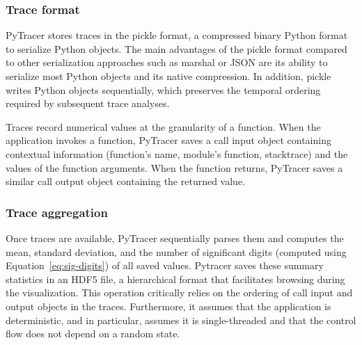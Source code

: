\documentclass[11pt]{article}
\newcommand{\pytracer}[0]{PyTracer\xspace}
\begin{document}

\subsubsection{Trace format}

\pytracer stores traces in the pickle format, a compressed binary Python format to serialize Python objects.
The main advantages of the pickle format compared to other serialization approaches such as marshal or JSON are its ability to serialize most Python objects and its native compression.  In addition, pickle writes Python objects sequentially, which preserves the temporal ordering required by subsequent trace analyses.

Traces record numerical values at the granularity of a function. When the application invokes a function, \pytracer saves a call input object containing contextual information (function's name, module's function, stacktrace) and the values of the function arguments. When the function returns, \pytracer saves a similar call output object containing the returned value. 


\subsubsection{Trace aggregation}

Once traces are available, \pytracer sequentially parses them and computes the mean, standard deviation, and the number of significant digits (computed using Equation~\ref{eq:sig-digits}) of all saved values. Pytracer saves these summary statistics in an HDF5 file, a hierarchical format that facilitates browsing during the visualization. This operation critically relies on the ordering of call input and output objects in the traces. Furthermore, it assumes that the application is deterministic, and in particular, assumes it is single-threaded and that the control flow does not depend on a random state. 
\end{document}
